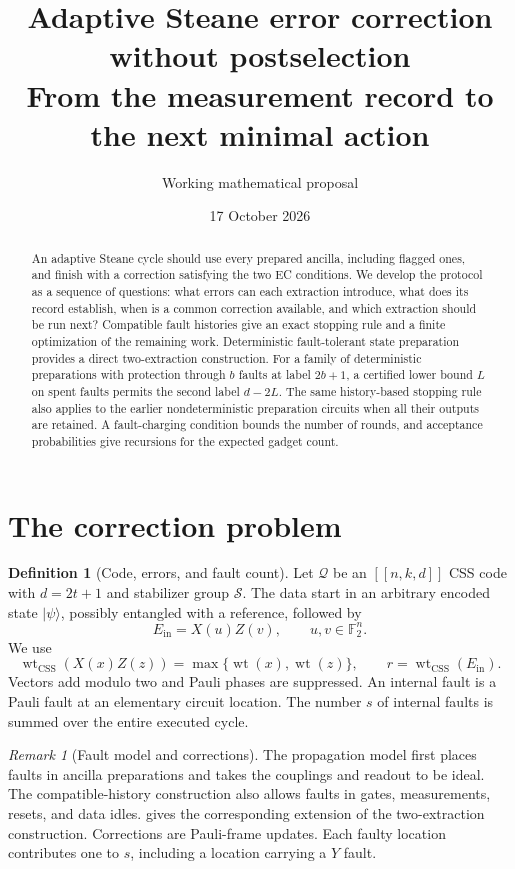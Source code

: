 \documentclass[11pt,a4paper]{article}
\title{Adaptive Steane error correction without postselection\\
\large From the measurement record to the next minimal action}
\author{Working mathematical proposal}
\date{17 October 2026}
\theoremstyle{definition}
\newtheorem{definition}[theorem]{Definition}
\theoremstyle{remark}
\newtheorem{remark}[theorem]{Remark}
\newcommand{\F}{\mathbb F_2}
\newcommand{\wt}{\operatorname{wt}}
\newcommand{\css}{\operatorname{wt}_{\mathrm{CSS}}}
\newcommand{\Q}{\mathcal Q}
\newcommand{\St}{\mathcal S}
\newcommand{\ket}[1]{\lvert #1\rangle}
\begin{document}
\maketitle
\begin{abstract}
An adaptive Steane cycle should use every prepared ancilla, including
flagged ones, and finish with a correction satisfying the two EC
conditions. We develop the protocol as a sequence of questions: what
errors can each extraction introduce, what does its record establish, when
is a common correction available, and which extraction should be run next?
Compatible fault histories give an exact stopping rule and a finite
optimization of the remaining work. Deterministic fault-tolerant state
preparation provides a direct two-extraction construction. For a family of
deterministic preparations with protection through $b$ faults at label
$2b+1$, a certified lower bound $L$ on spent faults permits the second
label $d-2L$. The same history-based stopping rule also applies to the
earlier nondeterministic preparation circuits when all their outputs are
retained. A fault-charging condition bounds the number of rounds, and
acceptance probabilities give recursions for the expected gadget count.
\end{abstract}

\section{The correction problem}
\label{sec:model}

\begin{definition}[Code, errors, and fault count]
Let $\Q$ be an $[[n,k,d]]$ CSS code with $d=2t+1$ and stabilizer group
$\St$. The data start in an arbitrary encoded state $\ket\psi$, possibly
entangled with a reference, followed by
\[
 E_{\mathrm{in}}=X(u)Z(v),\qquad u,v\in\F^n.
\]
We use
\begin{equation}
 \css(X(x)Z(z))=\max\{\wt(x),\wt(z)\},\qquad
 r=\css(E_{\mathrm{in}}).
 \label{eq:metric}
\end{equation}
Vectors add modulo two and Pauli phases are suppressed. An internal fault
is a Pauli fault at an elementary circuit location. The number $s$ of
internal faults is summed over the entire executed cycle.
\end{definition}

\begin{remark}[Fault model and corrections]
The propagation model first places faults in ancilla preparations and takes
the couplings and readout to be ideal. The compatible-history construction
also allows faults in gates, measurements, resets, and data idles.
 gives the corresponding extension of the
two-extraction construction. Corrections are Pauli-frame updates.
Each faulty location contributes one to $s$, including a location carrying
a $Y$ fault.
\end{remark}
\end{document}
